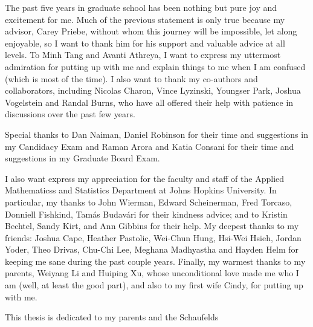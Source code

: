 \begin{frontmatter}
\begin{abstract}
\end{abstract}

\begin{acknowledgment}

The past five years in graduate school has been nothing but pure joy and excitement for me. Much of the previous statement is only true because my advisor, Carey Priebe, without whom this journey will be impossible, let along enjoyable, so I want to thank him for his support and valuable advice at all levels. To Minh Tang and Avanti Athreya, I want to express my uttermost admiration for putting up with me and explain things to me when I am confused (which is most of the time). I also want to thank my co-authors and collaborators, including Nicolas Charon, Vince Lyzinski, Youngser Park, Joshua Vogelstein and Randal Burns, who have all offered their help with patience in discussions over the past few years.


Special thanks to Dan Naiman, Daniel Robinson for their time and suggestions in my Candidacy Exam and Raman Arora and 
Katia Consani for their time and suggestions in my Graduate Board Exam.

I also want express my appreciation for the faculty and staff of the Applied Mathematicss and Statistics Department at Johns Hopkins University. In particular, my thanks to John Wierman,  Edward Scheinerman,  Fred Torcaso, Donniell Fishkind, Tam\'{a}s Budav\'{a}ri for their kindness advice; and to Kristin Bechtel, Sandy Kirt, and Ann Gibbins for their help.
My deepest thanks to my  friends: Joshua Cape, Heather Pastolic,  Wei-Chun Hung,  Hsi-Wei Hsieh, Jordan Yoder, Theo Drivas, Chu-Chi Lee, Meghana Madhyastha and Hayden Helm for keeping me sane during the past couple years.
Finally, my warmest thanks to my parents, Weiyang Li and Huiping Xu, whose unconditional love made me who I am (well, at least the good part), and also to my first wife Cindy, for putting up with me.

\end{acknowledgment}

\begin{dedication}
 
This thesis is dedicated to my parents and the Schaufelds

\end{dedication}

\tableofcontents

\listoftables

\listoffigures

\end{frontmatter}

